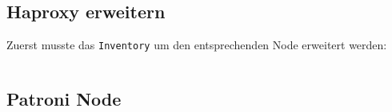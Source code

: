 \begin{flushleft}
    \subsection{Haproxy erweitern}
    Zuerst musste das \texttt{Inventory} um den entsprechenden Node erweitert werden:
    \lstset{style=gra_codestyle}
    \begin{lstlisting}[language=bash, caption=Testsystem - Deployment - inventory,captionpos=b,label={lst:testsystem-deployment-inventory},breaklines=true]

    \end{lstlisting}
    \subsection{Patroni Node}
\end{flushleft}
